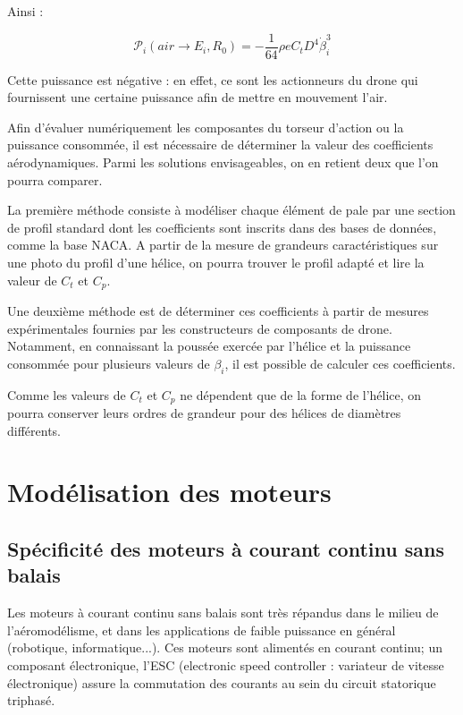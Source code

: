 \documentclass[10pt,a4paper]{article}
\begin{document}
Ainsi : 

\begin{equation}
\mathcal{P}_{i}(air \rightarrow E_{i}, R_{0}) =
- \frac{1}{64} \rho e C_{t} D^4 \dot \beta_{i}^3 
\end{equation}

Cette puissance est négative : en effet, ce sont les actionneurs du drone qui fournissent une certaine puissance afin de mettre en mouvement l'air.

Afin d'évaluer numériquement les composantes du torseur d'action ou la puissance consommée, il est nécessaire de déterminer la valeur des coefficients aérodynamiques. Parmi les solutions envisageables, on en retient deux que l'on pourra comparer.

La première méthode consiste à modéliser chaque élément de pale par une section de profil standard dont les coefficients sont inscrits dans des bases de données, comme la base NACA. A partir de la mesure de grandeurs caractéristiques sur une photo du profil d'une hélice, on pourra trouver le profil adapté et lire la valeur de $C_{t}$ et $C_{p}$.

Une deuxième méthode est de déterminer ces coefficients à partir de mesures expérimentales fournies par les constructeurs de composants de drone. Notamment, en connaissant la poussée exercée par l'hélice et la puissance consommée pour plusieurs valeurs de $\beta_{i}$, il est possible de calculer ces coefficients.

Comme les valeurs de $C_{t}$ et $C_{p}$ ne dépendent que de la forme de l'hélice, on pourra conserver leurs ordres de grandeur pour des hélices de diamètres différents.

\section{Modélisation des moteurs}

\subsection{Spécificité des moteurs à courant continu sans balais}

Les moteurs à courant continu sans balais sont très répandus dans le milieu de l'aéromodélisme, et dans les applications de faible puissance en général (robotique, informatique...). Ces moteurs sont alimentés en courant continu; un composant électronique, l'ESC (electronic speed controller : variateur de vitesse électronique) assure la commutation des courants au sein du circuit statorique triphasé. 
\end{document}
